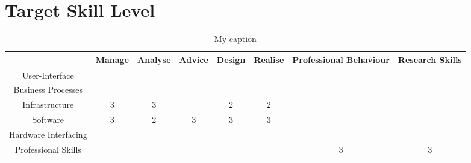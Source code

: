 \section{Target Skill Level}


\begin{table}[]
	\centering
	\caption{My caption}
	\label{Target Skills}
	\begin{tabular}{|c|c|c|c|c|c|c|c|}
		\hline
		& Manage                    & Analyse                   & Advice                    & Design                    & Realise & Professional Behaviour    & Research Skills \\ \hline
		User-Interface       &                           &                           &                           &                           &         &                           &                 \\ \hline
		Business Processes   &                           &                           &                           &                           &         &                           &                 \\ \hline
		Infrastructure       & \cellcolor[HTML]{FD6864}3 & \cellcolor[HTML]{FD6864}3 &                           & 2                         & 2       &                           &                 \\ \hline
		Software             & \cellcolor[HTML]{FD6864}3 & 2                         & \cellcolor[HTML]{FD6864}3 & \cellcolor[HTML]{FD6864}3 & 3       &                           &                 \\ \hline
		Hardware Interfacing &                           &                           &                           &                           &         &                           &                 \\ \hline
		Professional Skills  &                           &                           &                           &                           &         & \cellcolor[HTML]{FD6864}3 & 3 \\ \hline             
	\end{tabular}
\end{table}